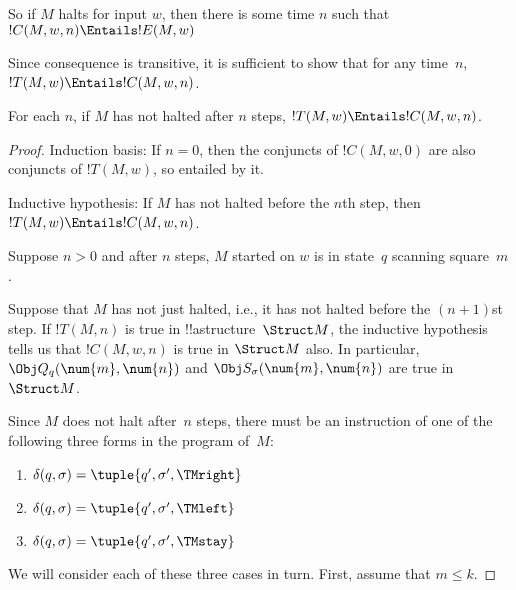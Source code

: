 \documentclass[../../../include/open-logic-section]{subfiles}
\begin{document}
So if $M$ halts for input $w$, then there is some time $n$ such that
$!C(M, w, n) \Entails !E(M,w)$

Since consequence is transitive, it is sufficient to show that for any
time~$n$, $!T(M, w) \Entails !C(M, w, n)$.

\begin{lem}
For each $n$, if $M$ has not halted after $n$ steps, $!T(M, w)
\Entails !C(M, w, n)$.
\end{lem}

\begin{proof}
Induction basis: If $n = 0$, then the conjuncts of $!C(M, w, 0)$ are
also conjuncts of $!T(M, w)$, so entailed by it.

Inductive hypothesis: If $M$ has not halted before the $n$th step,
then $!T(M,w) \Entails !C(M, w, n)$.

Suppose $n > 0$ and after $n$ steps, $M$ started on $w$ is in state~$q$
scanning square~$m$.

Suppose that $M$ has not just halted, i.e., it has not halted before
the $(n+1)$st step. If $!T(M,n)$ is true in !!a{structure}~$\Struct
M$, the inductive hypothesis tells us that $!C(M, w, n)$ is true in
$\Struct M$ also. In particular, $\Obj Q_q(\num{m}, \num{n})$ and
$\Obj S_\sigma(\num{m}, \num{n})$ are true in $\Struct M$.

Since $M$ does not halt after~$n$ steps, there must be an instruction
of one of the following three forms in the program of~$M$:

\begin{enumerate} 
\item {} $\delta(q, \sigma) = \tuple{q', \sigma', \TMright}$

\item {} $\delta(q, \sigma) = \tuple{q', \sigma', \TMleft}$

\item {} $\delta(q, \sigma) = \tuple{q', \sigma', \TMstay}$
\end{enumerate}

We will consider each of these three cases in turn.  First, assume
that $m \le k$.


\end{proof}
\end{document}
